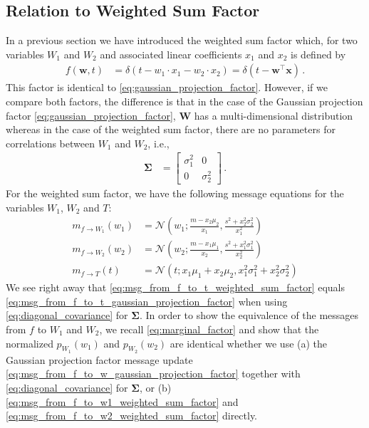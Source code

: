 \documentclass[a4paper]{article}
\newcommand{\Normal}[3]{{\mathcal N} \left({#1};{#2},{#3}\right)}
\newcommand{\bs}[1]{{\boldsymbol{#1}}}
\newcommand{\dirac}[1]{{\delta \left( {#1} \right)}}
\newcommand{\transpose}[1]{{#1}^\top}
\theoremstyle{definition}
\begin{document}
\subsection*{Relation to Weighted Sum Factor}
In a previous section we have introduced the weighted sum factor which, for two variables $W_1$ and $W_2$ and associated linear coefficients $x_1$ and $x_2$ is defined by 
\begin{align*}
    f(\bs{w},t) & = \dirac{t - w_1 \cdot x_1 - w_2 \cdot x_2} = \dirac{t - \transpose{\bs{w}}\bs{x}} \,.
\end{align*}
This factor is identical to \eqref{eq:gaussian_projection_factor}. However, if we compare both factors, the difference is that in the case of the Gaussian projection factor \eqref{eq:gaussian_projection_factor}, $\bs{W}$ has a multi-dimensional distribution whereas in the case of the weighted sum factor, there are no parameters for correlations between $W_1$ and $W_2$, i.e.,
\begin{align}
    \bs{\Sigma} & = \left[ \begin{array}{cc} \sigma_1^2 & 0 \\ 0 & \sigma_2^2 \end{array} \right] \label{eq:diagonal_covariance} \,.
\end{align}
For the weighted sum factor, we have the following message equations for the variables $W_1$, $W_2$ and $T$:
\begin{align}
    m_{f \to W_1}(w_1) & = \Normal{w_1}{\frac{m - x_2 \mu_2}{x_1}}{\frac{s^2 + x_2^2 \sigma_2^2}{x_1^2}} \label{eq:msg_from_f_to_w1_weighted_sum_factor} \\
    m_{f \to W_2}(w_2) & = \Normal{w_2}{\frac{m - x_1 \mu_1}{x_2}}{\frac{s^2 + x_1^2 \sigma_1^2}{x_2^2}} \label{eq:msg_from_f_to_w2_weighted_sum_factor} \\
    m_{f \to T}(t) & = \Normal{t}{x_1 \mu_1 + x_2 \mu_2}{x_1^2 \sigma_1^2 + x_2^2 \sigma_2^2} \label{eq:msg_from_f_to_t_weighted_sum_factor}
\end{align}
We see right away that \eqref{eq:msg_from_f_to_t_weighted_sum_factor} equals \eqref{eq:msg_from_f_to_t_gaussian_projection_factor} when using \eqref{eq:diagonal_covariance} for $\bs{\Sigma}$. In order to show the equivalence of the messages from $f$ to $W_1$ and $W_2$, we recall \eqref{eq:marginal_factor} and show that the normalized $p_{W_1}(w_1)$ and $p_{W_2}(w_2)$ are identical whether we use (a) the Gaussian projection factor message update \eqref{eq:msg_from_f_to_w_gaussian_projection_factor} together with \eqref{eq:diagonal_covariance} for $\bs{\Sigma}$, or (b)  \eqref{eq:msg_from_f_to_w1_weighted_sum_factor} and \eqref{eq:msg_from_f_to_w2_weighted_sum_factor} directly.
\end{document}
